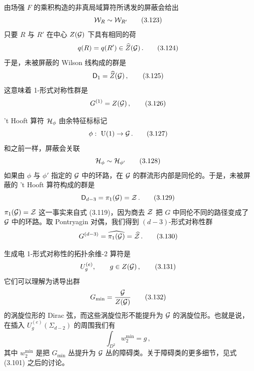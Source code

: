 由场强 $F$ 的乘积构造的非真局域算符所诱发的屏蔽会给出
\begin{equation}
    \mathcal{W}_R \sim \mathcal{W}_{R'}
    \tag{3.123}
\end{equation}
只要 $R$ 与 $R'$ 在中心 $Z(\mathcal{G})$ 下具有相同的荷
\begin{equation}
    q(R) = q(R') \in \widehat{Z}(\mathcal{G}) \,.
    \tag{3.124}
\end{equation}
于是，未被屏蔽的 Wilson 线构成的群是
\begin{equation}
    \mathsf{D}_1 = \widehat{Z}(\mathcal{G}) \,,
    \tag{3.125}
\end{equation}
这意味着 1-形式对称性群是
\begin{equation}
    G^{(1)} = Z(\mathcal{G}) \,,
    \tag{3.126}
\end{equation}



't Hooft 算符 $\mathcal{H}_\phi$ 由余特征标标记
\begin{equation}
    \phi:\ \mathrm{U}(1) \to \mathcal{G} \,.
    \tag{3.127}
\end{equation}
和之前一样，屏蔽会关联
\begin{equation}
    \mathcal{H}_\phi \sim \mathcal{H}_{\phi'}
    \tag{3.128}
\end{equation}
如果由 $\phi$ 与 $\phi'$ 指定的 $\mathcal{G}$ 中的环路，在 $\mathcal{G}$ 的群流形内部是同伦的。于是，未被屏蔽的 't Hooft 算符构成的群是
\begin{equation}
    \mathsf{D}_{d-3} = \pi_1(\mathcal{G}) = \mathcal{Z} \,.
    \tag{3.129}
\end{equation}
$\pi_1(\mathcal{G}) = \mathcal{Z}$ 这一事实来自式 (3.119)，因为商去 $\mathcal{Z}$ 把 $G$ 中同伦不同的路径变成了 $\mathcal{G}$ 中的环路。取 Pontryagin 对偶，我们得到 $(d-3)$-形式对称性群
\begin{equation}
    G^{(d-3)} = \widehat{\pi_1(\mathcal{G})} = \widehat{\mathcal{Z}} \,.
    \tag{3.130}
\end{equation}


生成电 1-形式对称性的拓扑余维-2 算符是
\begin{equation}
    U_g^{(e)} ,\qquad g \in Z(\mathcal{G}) \,,
    \tag{3.131}
\end{equation}
它们可以理解为诱导出群
\begin{equation}
    G_{\min} = \frac{\mathcal{G}}{Z(\mathcal{G})}
    \tag{3.132}
\end{equation}
的涡旋位形的 Dirac 弦，而这些涡旋位形不能提升为 $\mathcal{G}$ 的涡旋位形。也就是说，在插入 $U_g^{(e)}(\Sigma_{d-2})$ 的周围我们有
\begin{equation}
    \int_{D^2} w_2^{\min} = g \,,
    \tag{3.133}
\end{equation}
其中 $w_2^{\min}$ 是把 $G_{\min}$ 丛提升为 $\mathcal{G}$ 丛的障碍类。关于障碍类的更多细节，见式 (3.101) 之后的讨论。

